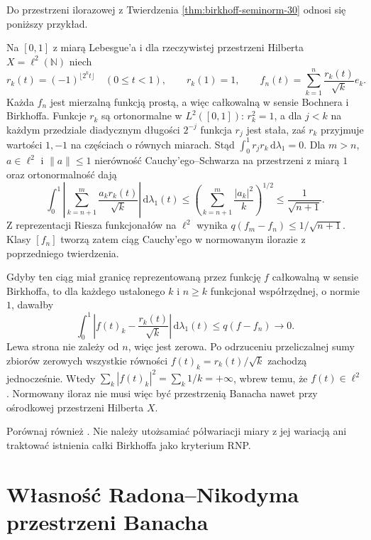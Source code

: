 Do przestrzeni ilorazowej z Twierdzenia
\ref{thm:birkhoff-seminorm-30} odnosi się
poniższy przykład.

\begin{przyklad}
\label{ex:birkhoff-q-incomplete-30}
Na $[0,1]$ z miarą Lebesgue'a i dla rzeczywistej
przestrzeni Hilberta $X=\ell^2(\mathbb N)$ niech
\[
 r_k(t)=(-1)^{\lfloor 2^k t\rfloor}\quad(0\le t<1),
 \qquad r_k(1)=1,\qquad
 f_n(t)=\sum_{k=1}^n\frac{r_k(t)}{\sqrt{k}}e_k.
\]
Każda $f_n$ jest mierzalną funkcją prostą,
a więc całkowalną w sensie Bochnera i Birkhoffa.
Funkcje $r_k$ są ortonormalne w $L^2([0,1])$:
$r_k^2=1$, a dla $j<k$ na każdym przedziale
diadycznym długości $2^{-j}$ funkcja $r_j$
jest stała, zaś $r_k$ przyjmuje wartości $1,-1$
na częściach o równych miarach.
Stąd $\int_0^1r_jr_k\,\mathrm d\lambda_1=0$.
Dla $m>n$, $a\in\ell^2$ i $\|a\|\le1$
nierówność Cauchy'ego--Schwarza na przestrzeni
z miarą $1$ oraz ortonormalność dają
\[
 \int_0^1\left|\sum_{k=n+1}^m
                \frac{a_k r_k(t)}{\sqrt k}\right|
                \,\mathrm d\lambda_1(t)
 \le\left(\sum_{k=n+1}^m\frac{|a_k|^2}{k}\right)^{1/2}
 \le\frac{1}{\sqrt{n+1}}.
\]
Z reprezentacji Riesza funkcjonałów na $\ell^2$
wynika $q(f_m-f_n)\le1/\sqrt{n+1}$.
Klasy $[f_n]$ tworzą zatem ciąg Cauchy'ego
w normowanym ilorazie z poprzedniego twierdzenia.

Gdyby ten ciąg miał granicę reprezentowaną
przez funkcję $f$ całkowalną w sensie Birkhoffa,
to dla każdego ustalonego $k$ i $n\ge k$
funkcjonał współrzędnej, o normie $1$, dawałby
\[
 \int_0^1\left|f(t)_k-\frac{r_k(t)}{\sqrt k}\right|
                  \,\mathrm d\lambda_1(t)
 \le q(f-f_n)\longrightarrow0.
\]
Lewa strona nie zależy od $n$, więc jest zerowa.
Po odrzuceniu przeliczalnej sumy zbiorów zerowych
wszystkie równości $f(t)_k=r_k(t)/\sqrt k$
zachodzą jednocześnie. Wtedy
$\sum_k|f(t)_k|^2=\sum_k1/k=+\infty$,
wbrew temu, że $f(t)\in\ell^2$.
Normowany iloraz nie musi więc być przestrzenią
Banacha nawet przy ośrodkowej przestrzeni Hilberta $X$.
\end{przyklad}

\noindent Porównaj również
.
Nie należy utożsamiać półwariacji miary z jej wariacją
ani traktować istnienia całki Birkhoffa jako kryterium RNP.

\section{Własność Radona--Nikodyma przestrzeni Banacha}
\label{sec:rnp-30}

